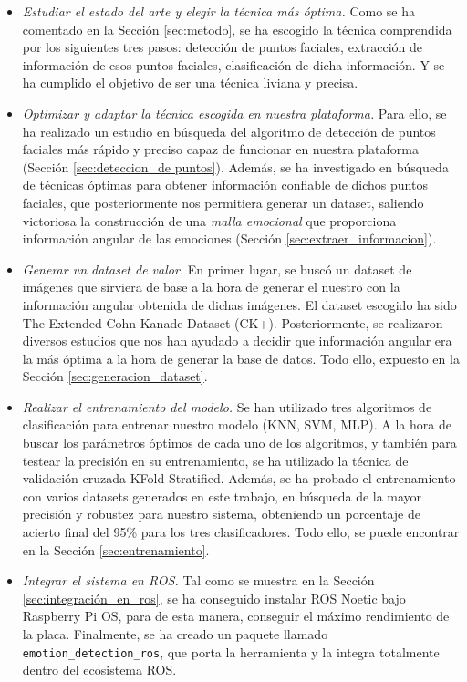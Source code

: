 \begin{itemize}
    \item \textit{Estudiar el estado del arte y elegir la técnica más óptima.} Como se ha comentado en la Sección \ref{sec:metodo}, se ha escogido la técnica comprendida por los siguientes tres pasos: detección de puntos faciales, extracción de información de esos puntos faciales, clasificación de dicha información. Y se ha cumplido el objetivo de ser una técnica liviana y precisa.
    
    \item \textit{Optimizar y adaptar la técnica escogida en nuestra plataforma.} Para ello, se ha realizado un estudio en búsqueda del algoritmo de detección de puntos faciales más rápido y preciso capaz de funcionar en nuestra plataforma (Sección \ref{sec:deteccion_de puntos}). Además, se ha investigado en búsqueda de técnicas óptimas para obtener información confiable de dichos puntos faciales, que posteriormente nos permitiera generar un dataset, saliendo victoriosa la construcción de una \textit{malla emocional}\cite{mediapipe_emotions} que proporciona información angular de las emociones (Sección \ref{sec:extraer_informacion}).
    
    \item \textit{Generar un dataset de valor.} En primer lugar, se buscó un dataset de imágenes que sirviera de base a la hora de generar el nuestro con la información angular obtenida de dichas imágenes. El dataset escogido ha sido The Extended Cohn-Kanade Dataset (CK+)\cite{Kanade1}\cite{Kanade2}. Posteriormente, se realizaron diversos estudios que nos han ayudado a decidir que información angular era la más óptima a la hora de generar la base de datos. Todo ello, expuesto en la Sección \ref{sec:generacion_dataset}.
    
    \item \textit{Realizar el entrenamiento del modelo.} Se han utilizado tres algoritmos de clasificación para entrenar nuestro modelo (KNN, SVM, MLP). A la hora de buscar los parámetros óptimos de cada uno de los algoritmos, y también para testear la precisión en su entrenamiento, se ha utilizado la técnica de validación cruzada KFold Stratified. Además, se ha probado el entrenamiento con varios datasets generados en este trabajo, en búsqueda de la mayor precisión y robustez para nuestro sistema, obteniendo un porcentaje de acierto final del 95\% para los tres clasificadores. Todo ello, se puede encontrar en la Sección \ref{sec:entrenamiento}.
    
    \item \textit{Integrar el sistema en ROS.} Tal como se muestra en la Sección \ref{sec:integración_en_ros}, se ha conseguido instalar ROS Noetic bajo Raspberry Pi OS, para de esta manera, conseguir el máximo rendimiento de la placa. Finalmente, se ha creado un paquete llamado \verb|emotion_detection_ros|, que porta la herramienta y la integra totalmente dentro del ecosistema ROS.
\end{itemize}

